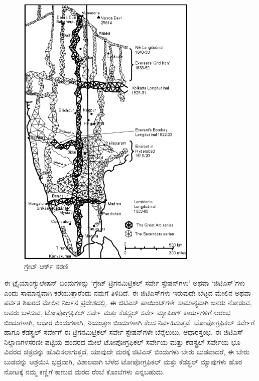 \begin{figure}[!htbp]
\includegraphics{"images/image004.jpg"}
\caption{ಗ್ರೇಟ್ ಆರ್ಕ್ ಸರಣಿ}\label{chap3-fig02}
\end{figure}

ಈ ಟ್ರೈಯಾಂಗ್ಯುಲೇಷನ್​ ಬಿಂದುಗಳನ್ನು ‘ಗ್ರೇಟ್​ ಟ್ರಿಗನಮಿಟ್ರಿಕಲ್​ ಸರ್ವೇ ಸ್ಟೇಷನ್​\break ಗಳು’ ಅಥವಾ ‘ಜಿಟಿಎಸ್​’ಗಳು ಎಂದು ಸಾಮಾನ್ಯವಾಗಿ ಕರೆಯುತ್ತಾರೆಂದು ನಮಗೆ ತಿಳಿದಿದೆ. ಈ ಜಿಟಿಎಸ್​ಗಳು ಇರುವುದೇ ಬೆಟ್ಟದ ಮೇಲಿನ ಅಥವಾ ಪರ್ವತ ಶಿಖರದ ಮೇಲಿನ ನಿರ್ಜನ ಪ್ರದೇಶದಲ್ಲಿ. ಈ ಜಿಟಿಎಸ್​ ಪಾಯಿಂಟ್​ಗಳೇ ಸಾಮಾನ್ಯವಾಗಿ ಜನರು ನೋಡುವ, ಅವರು ಬಳಸುವ, ಟೋಪೋಗ್ರಫಿಕಲ್​ ಸರ್ವೇ ಮತ್ತು ಕೆಡಸ್ಟ್ರಲ್​ ಸರ್ವೇ ಮ್ಯಾಪಿಂಗ್​ ಕಾರ್ಯಗಳಿಗೆ ಆರಂಭ ಬಿಂದುಗಳಾಗಿ, ಆಧಾರ ಬಿಂದುಗಳಾಗಿ, ನಿಯಂತ್ರಣ ಬಿಂದುಗಳಾಗಿ ಕೆಲಸ ನಿರ್ವಹಿಸುತ್ತವೆ. ಟೋಪೋಗ್ರಫಿಕಲ್​ ಸರ್ವೇಗೆ ಹಾಗೂ ಕೆಡಸ್ಟ್ರಲ್​ ಸರ್ವೇಗೆ ಈ ಟ್ರಿಗನಮಿಟ್ರಿಕಲ್​ ಸರ್ವೇ ಸ್ಟೇಷನ್​ಗಳೇ ಬೆನ್ನೆಲುಬು, ಆಧಾರಸ್ತಂಭ. ಈ ಜಿಟಿಎಸ್​ ನಿಲ್ದಾಣಗಳ\break ಸರಣೀ ಪಟ್ಟಿಯ ಹಂದರದ ಮೇಲೆ ಟೋಪೋಗ್ರಫಿಕಲ್​ ಸರ್ವೇಯ ಮತ್ತು ಕೆಡಸ್ಟ್ರಲ್​ ಸರ್ವೇಯ ಭೂ ವಿವರದ ಚಿತ್ರವನ್ನು ಹೊದಿಸಲಾಗುತ್ತದೆ. ಯಾವುದೇ ಮರಕ್ಕೆ ಜಿಟಿಎಸ್​ ಬಿಂದುಗಳು ಬೇರು ಬುಡವಾದರೆ, ಈ ಬೇರು ಬುಡವನ್ನು ಆಶ್ರಯಿಸಿ ಭದ್ರವಾಗಿ, ವಿಶಾಲವಾಗಿ ಬೆಳೆದ ಟೋಪೋಗ್ರಫಿಕಲ್​ ಮತ್ತು ಕೆಡಸ್ಟ್ರಲ್​ ಮ್ಯಾಪುಗಳು ಹೊರ ನೋಟಕ್ಕೆ ನಮ್ಮ ಕಣ್ಣಿಗೆ ಕಾಣುವ ಮರದ ರೆಂಬೆ ಕೊಂಬೆಗಳು ಎನ್ನಬಹುದು.

